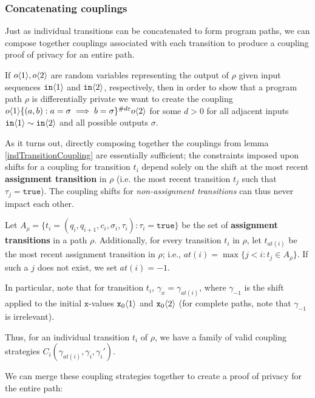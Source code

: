 \subsubsection{Concatenating couplings}

Just as individual transitions can be concatenated to form program paths, we can compose together couplings associated with each transition to produce a coupling proof of privacy for an entire path. 

If $o\langle1 \rangle, o\langle2 \rangle$ are random variables representing the output of $\rho$ given input sequences $\texttt{in}\langle1 \rangle$ and $\texttt{in}\langle2 \rangle$, respectively, 
then in order to show that a program path $\rho$ is differentially private we want to create the coupling $o\langle1 \rangle\{(a, b): a=\sigma\implies b=\sigma\}^{\#d\varepsilon}o\langle2 \rangle$ for some $d>0$ for all adjacent inputs $\texttt{in}\langle1 \rangle\sim\texttt{in}\langle2 \rangle$ and all possible outputs $\sigma$.

As it turns out, directly composing together the couplings from lemma \ref{indTransitionCoupling} are essentially sufficient; the constraints imposed upon shifts for a coupling for transition $t_i$ depend solely on the shift at the most recent \textbf{assignment transition} in $\rho$ (i.e. the most recent transition $t_j$ such that $\tau_j = \texttt{true}$). 
The coupling shifts for \textit{non-assignment transitions} can thus never impact each other. 

\begin{defn}
    Let $A_\rho = \{t_i=(q_i, q_{i+1}, c_i, \sigma_i, \tau_i): \tau_i = \texttt{true}\}$ be the set of \textbf{assignment transitions} in a path $\rho$. Additionally, for every transition $t_i$ in $\rho$, let $t_{at(i)}$ be the most recent assignment transition in $\rho$; i.e., $at(i) = \max\{j<i: t_j\in A_\rho\}$. If such a $j$ does not exist, we set $at(i)=-1$. 
\end{defn}

In particular, note that for transition $t_i$, $\gamma_x = \gamma_{at(i)}$, where $\gamma_{-1}$ is the shift applied to the initial $\texttt{x}$-values $\texttt{x}_0\langle1 \rangle$ and $\texttt{x}_0\langle2 \rangle$ (for complete paths, note that $\gamma_{-1}$ is irrelevant).

Thus, for an individual transition $t_i$ of $\rho$, we have a family of valid coupling strategies $C_i(\gamma_{at(i)}, \gamma_i, \gamma_i')$. 

We can merge these coupling strategies together to create a proof of privacy for the entire path: 

